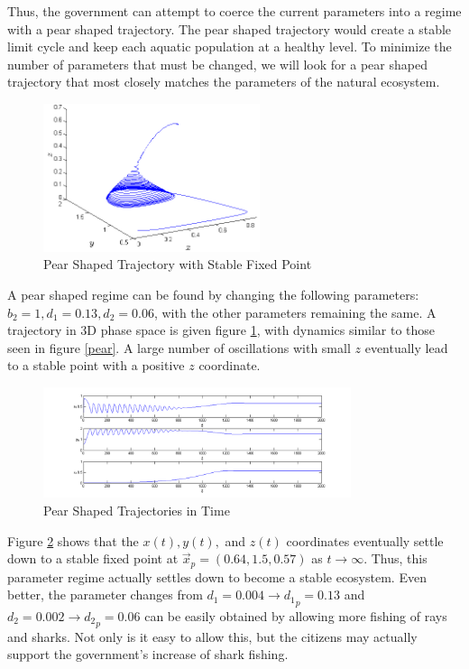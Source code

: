 \documentclass[12pt,journal,compsoc,twoside]{IEEEtran}
\begin{document}
Thus, the government can attempt to coerce the current parameters into a regime with a pear shaped trajectory. The pear shaped trajectory would create a stable limit cycle and keep each aquatic population at a healthy level. To minimize the number of parameters that must be changed, we will look for a pear shaped trajectory that most closely matches the parameters of the natural ecosystem.
\begin{figure}[h!]
\centering
\includegraphics[width=2.5in]{pear2.png}
\caption{Pear Shaped Trajectory with Stable Fixed Point}
\label{pear2}
\end{figure}

A pear shaped regime can be found by changing the following parameters: $b_2 = 1, d_1 = 0.13, d_2 = 0.06$, with the other parameters remaining the same. A trajectory in 3D phase space is given figure \ref{pear2}, with dynamics similar to those seen in figure \ref{pear}. A large number of oscillations with small $z$ eventually lead to a stable point with a positive $z$ coordinate.  
\begin{figure}[h!]
\centering
\includegraphics[width=3.55in]{peartrajectory.png}
\caption{Pear Shaped Trajectories in Time}
\label{peartrajectory}
\end{figure}

Figure \ref{peartrajectory} shows that the $x(t),y(t),$ and $z(t)$ coordinates eventually settle down to a stable fixed point at $\vec{x}_p = (0.64, 1.5, 0.57)$ as $t \to \infty$. Thus, this parameter regime actually settles down to become a stable ecosystem. Even better, the parameter changes from $d_1 = 0.004 \to {d_1}_p = 0.13$ and $d_2 = 0.002 \to {d_2}_p = 0.06$ can be easily obtained by allowing more fishing of rays and sharks. Not only is it easy to allow this, but the citizens may actually support the government's increase of shark fishing.
\end{document}
